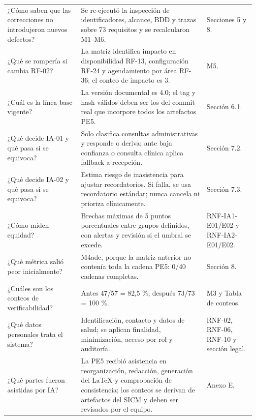 \documentclass[11pt,a4paper]{article}
\begin{document}
\begin{appendices}
\begin{longtable}{p{4.6cm}p{7.5cm}p{3cm}}
		¿Cómo saben que las correcciones no introdujeron nuevos defectos? & Se re-ejecutó la inspección de identificadores, alcance, BDD y trazas sobre 73 requisitos y se recalcularon M1--M6. & Secciones 5 y 8. \\
		¿Qué se rompería si cambia RF-02? & La matriz identifica impacto en disponibilidad RF-13, configuración RF-24 y agendamiento por área RF-36; el conteo de impacto es 3. & M5. \\
		¿Cuál es la línea base vigente? & La versión documental es 4.0; el tag y hash válidos deben ser los del commit real que incorpore todos los artefactos PE5. & Sección 6.1. \\
		¿Qué decide IA-01 y qué pasa si se equivoca? & Solo clasifica consultas administrativas y responde o deriva; ante baja confianza o consulta clínica aplica fallback a recepción. & Sección 7.2. \\
		¿Qué decide IA-02 y qué pasa si se equivoca? & Estima riesgo de inasistencia para ajustar recordatorios. Si falla, se usa recordatorio estándar; nunca cancela ni prioriza clínicamente. & Sección 7.3. \\
		¿Cómo miden equidad? & Brechas máximas de 5 puntos porcentuales entre grupos definidos, con alertas y revisión si el umbral se excede. & RNF-IA1-E01/E02 y RNF-IA2-E01/E02. \\
		¿Qué métrica salió peor inicialmente? & M4ade, porque la matriz anterior no contenía toda la cadena PE5: 0/40 cadenas completas. & Sección 8. \\
		¿Cuáles son los conteos de verificabilidad? & Antes 47/57 = 82,5 \%; después 73/73 = 100 \%. & M3 y Tabla de conteos. \\
		¿Qué datos personales trata el sistema? & Identificación, contacto y datos de salud; se aplican finalidad, minimización, acceso por rol y auditoría. & RNF-02, RNF-06, RNF-10 y sección legal. \\
		¿Qué partes fueron asistidas por IA? & La PE5 recibió asistencia en reorganización, redacción, generación del LaTeX y comprobación de consistencia; los conteos se derivan de artefactos del SICM y deben ser revisados por el equipo. & Anexo E. \\
		\bottomrule\end{longtable}
	

\end{appendices}
\end{document}
